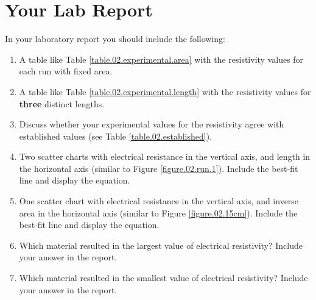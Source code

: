 \section{Your Lab Report}
%
In your laboratory report you should include the following:
\begin{enumerate}
	\item A table like Table \ref{table.02.experimental.area} with the resistivity values for each run with fixed area.
	\item A table like Table \ref{table.02.experimental.length} with the resistivity values for \textbf{three} distinct lengths.
	\item Discuss whether your experimental values for the resistivity agree with established values (see Table \ref{table.02.established}).
	\item Two scatter charts with electrical resistance in the vertical axis, and length in the horizontal axis (similar to Figure \ref{figure.02.run.1}). Include the best-fit line and display the equation.
	\item One scatter chart with electrical resistance in the vertical axis, and inverse area in the horizontal axis (similar to Figure \ref{figure.02.15cm}). Include the best-fit line and display the equation.
	\item Which material resulted in the largest value of electrical resistivity? Include your answer in the report.
	\item Which material resulted in the smallest value of electrical resistivity? Include your answer in the report.
\end{enumerate}
%
\newpage
